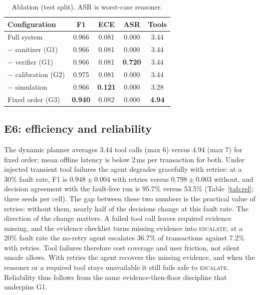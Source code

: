 \documentclass[conference]{IEEEtran}
\begin{document}
\begin{table}[t]
\caption{Ablation (test split). ASR is worst-case reasoner.}
\label{tab:ablation}
\centering
\small
\begin{tabular}{@{}lcccc@{}}
\toprule
Configuration & F1 & ECE & ASR & Tools \\
\midrule
Full system        & 0.966 & 0.081 & 0.000 & 3.44 \\
$-$ sanitizer (G1) & 0.966 & 0.081 & 0.000 & 3.44 \\
$-$ verifier (G1)  & 0.966 & 0.081 & \textbf{0.720} & 3.44 \\
$-$ calibration (G2)& 0.975 & 0.081 & 0.000 & 3.44 \\
$-$ simulation     & 0.966 & \textbf{0.121} & 0.000 & 3.28 \\
Fixed order (G3)   & \textbf{0.940} & 0.082 & 0.000 & \textbf{4.94} \\
\bottomrule
\end{tabular}
\end{table}

\subsection{E6: efficiency and reliability}
The dynamic planner averages 3.44 tool calls (max 6) versus 4.94 (max 7) for fixed
order; mean offline latency is below 2\,ms per transaction for both. Under injected transient tool failures the
agent degrades gracefully with retries: at a 30\% fault rate, F1 is
$0.948\pm0.004$ with retries versus $0.798\pm0.003$ without, and decision agreement
with the fault-free run is 95.7\% versus 53.5\% (Table~\ref{tab:rel}; three seeds per
cell). The gap between these two numbers is the practical value of retries: without
them, nearly half of the decisions change at this fault rate. The direction of the
change matters. A failed tool call leaves
required evidence missing, and the evidence checklist turns missing evidence into
\textsc{escalate}; at a 20\% fault rate the no-retry agent escalates 36.7\% of
transactions against 7.2\% with retries. Tool failures therefore cost coverage and
user friction, not silent unsafe allows. With retries the agent recovers the missing
evidence, and when the reasoner or a required tool stays unavailable it still fails
safe to \textsc{escalate}. Reliability thus follows from the same
evidence-then-floor discipline that underpins G1.
\end{document}
